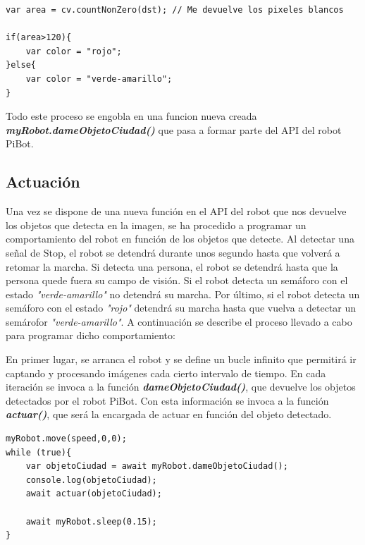 \documentclass{report}
\begin{document}
\begin{lstlisting}[backgroundcolor = \color{light-gray},
				   aboveskip = 2em,
				   belowskip = 2em,
                   xleftmargin = 2cm,
                   framexleftmargin = 1em,
                   basicstyle=\small]
var area = cv.countNonZero(dst); // Me devuelve los pixeles blancos

if(area>120){
	var color = "rojo";
}else{
	var color = "verde-amarillo";
}
\end{lstlisting}

Todo este proceso se engobla en una funcion nueva creada \textit{\textbf{myRobot.dameObjetoCiudad()}} que pasa a formar parte del API del robot PiBot.

\subsection{Actuación}
Una vez se dispone de una nueva función en el API del robot que nos devuelve los objetos que detecta en la imagen, se ha procedido a programar un comportamiento del robot en función de los objetos que detecte. Al detectar una señal de Stop, el robot se detendrá durante unos segundo hasta que volverá a retomar la marcha. Si detecta una persona, el robot se detendrá hasta que la persona quede fuera su campo de visión. Si el robot detecta un semáforo con el estado \textit{"verde-amarillo"} no detendrá su marcha. Por último, si el robot detecta un semáforo con el estado \textit{"rojo"} detendrá su marcha hasta que vuelva a detectar un semárofor \textit{"verde-amarillo"}. A continuación se describe el proceso llevado a cabo para programar dicho comportamiento:

\newpage
En primer lugar, se arranca el robot y se define un bucle infinito que permitirá ir captando y procesando imágenes cada cierto intervalo de tiempo. En cada iteración se invoca a la función \textit{\textbf{dameObjetoCiudad()}}, que devuelve los objetos detectados por el robot PiBot. Con esta información se invoca a la función \textit{\textbf{actuar()}}, que será la encargada de actuar en función del objeto detectado.

\begin{lstlisting}[backgroundcolor = \color{light-gray},
				   aboveskip = 2em,
				   belowskip = 2em,
                   xleftmargin = 2cm,
                   framexleftmargin = 1em,
                   basicstyle=\small]
myRobot.move(speed,0,0);                   
while (true){
	var objetoCiudad = await myRobot.dameObjetoCiudad();
	console.log(objetoCiudad);
	await actuar(objetoCiudad);

	await myRobot.sleep(0.15);
}
\end{lstlisting}
\end{document}
